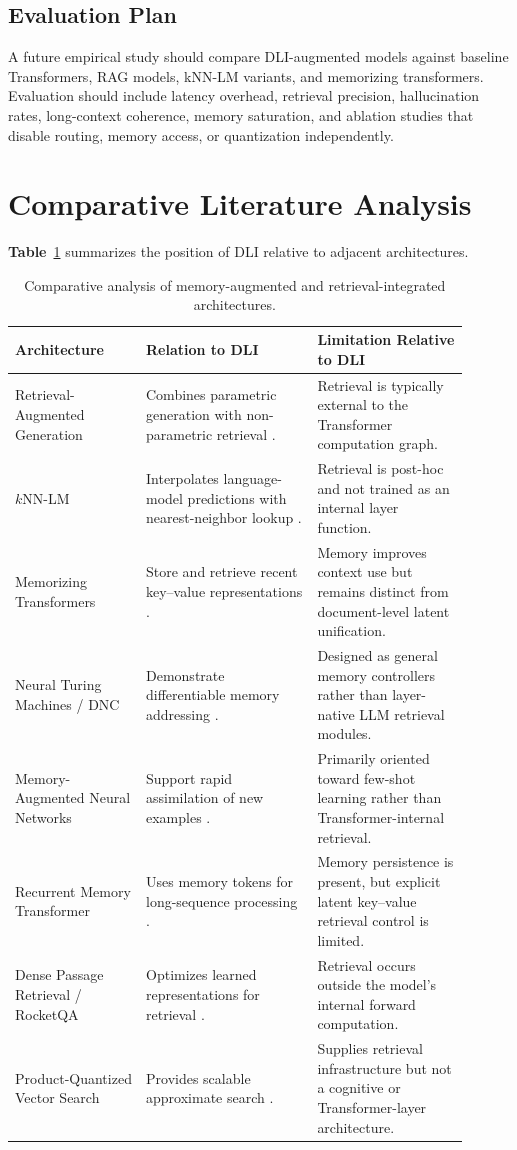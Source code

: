 \subsection{Evaluation Plan}
A future empirical study should compare DLI-augmented models against baseline Transformers, RAG models, kNN-LM variants, and memorizing transformers. Evaluation should include latency overhead, retrieval precision, hallucination rates, long-context coherence, memory saturation, and ablation studies that disable routing, memory access, or quantization independently.

\section{Comparative Literature Analysis}
\textbf{Table}~\ref{tab:comparative-architectures} summarizes the position of DLI relative to adjacent architectures.

\begin{table}
\centering
\small
\begin{tabular}{p{0.26\linewidth}p{0.34\linewidth}p{0.30\linewidth}}
\hline
\textbf{Architecture} & \textbf{Relation to DLI} & \textbf{Limitation Relative to DLI} \\
\hline
Retrieval-Augmented Generation & Combines parametric generation with non-parametric retrieval \cite{Lewis2021}. & Retrieval is typically external to the Transformer computation graph. \\
$k$NN-LM & Interpolates language-model predictions with nearest-neighbor lookup \cite{Khandelwal2020}. & Retrieval is post-hoc and not trained as an internal layer function. \\
Memorizing Transformers & Store and retrieve recent key--value representations \cite{Wu2022}. & Memory improves context use but remains distinct from document-level latent unification. \\
Neural Turing Machines / DNC & Demonstrate differentiable memory addressing \cite{Graves2014,Graves2016}. & Designed as general memory controllers rather than layer-native LLM retrieval modules. \\
Memory-Augmented Neural Networks & Support rapid assimilation of new examples \cite{Santoro2016}. & Primarily oriented toward few-shot learning rather than Transformer-internal retrieval. \\
Recurrent Memory Transformer & Uses memory tokens for long-sequence processing \cite{Bulatov2022}. & Memory persistence is present, but explicit latent key--value retrieval control is limited. \\
Dense Passage Retrieval / RocketQA & Optimizes learned representations for retrieval \cite{Qu2021}. & Retrieval occurs outside the model's internal forward computation. \\
Product-Quantized Vector Search & Provides scalable approximate search \cite{Jgou2011,Johnson2021}. & Supplies retrieval infrastructure but not a cognitive or Transformer-layer architecture. \\
\hline
\end{tabular}
\caption{Comparative analysis of memory-augmented and retrieval-integrated architectures.}
\label{tab:comparative-architectures}
\end{table}

